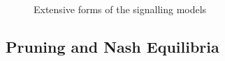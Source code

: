 \documentclass[a4paper,10pt]{article}
\numberwithin{equation}{section}
\begin{document}
\begin{figure}[h]
\begin{center}
\hfill
{}
\end{center}
\caption{Extensive forms of the signalling models}
\label{fig:Graph3.png and fig:Graph4.png}
\end{figure}

\subsection{Pruning and Nash Equilibria}
\label{sec:Pruning and Nash Equilibria}
\end{document}

